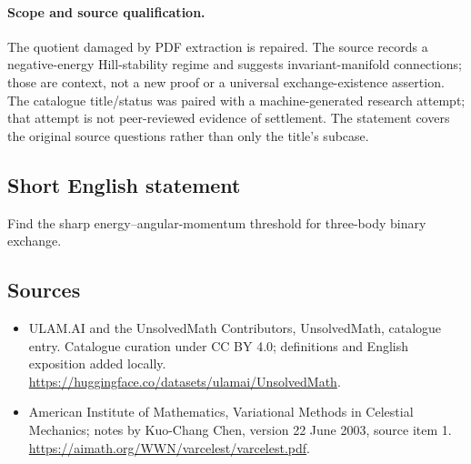 \documentclass[11pt]{article}
\begin{document}
\paragraph{Scope and source qualification.}The quotient damaged by PDF extraction is repaired. The source records a negative-energy Hill-stability regime and suggests invariant-manifold connections; those are context, not a new proof or a universal exchange-existence assertion. The catalogue title/status was paired with a machine-generated research attempt; that attempt is not peer-reviewed evidence of settlement. The statement covers the original source questions rather than only the title’s subcase.
\subsection{Short English statement}
Find the sharp energy–angular-momentum threshold for three-body binary exchange.
\subsection{Sources}
\begin{itemize}
\item[\hypertarget{source:statement:1}{S1}] ULAM.AI and the UnsolvedMath Contributors, UnsolvedMath, catalogue entry. Catalogue curation under CC BY 4.0; definitions and English exposition added locally.
\url{https://huggingface.co/datasets/ulamai/UnsolvedMath}.
\item[\hypertarget{source:statement:2}{S2}] American Institute of Mathematics, Variational Methods in Celestial Mechanics; notes by Kuo-Chang Chen, version 22 June 2003, source item 1.
\url{https://aimath.org/WWN/varcelest/varcelest.pdf}.
\end{itemize}
\label{end:statement}
\end{document}
